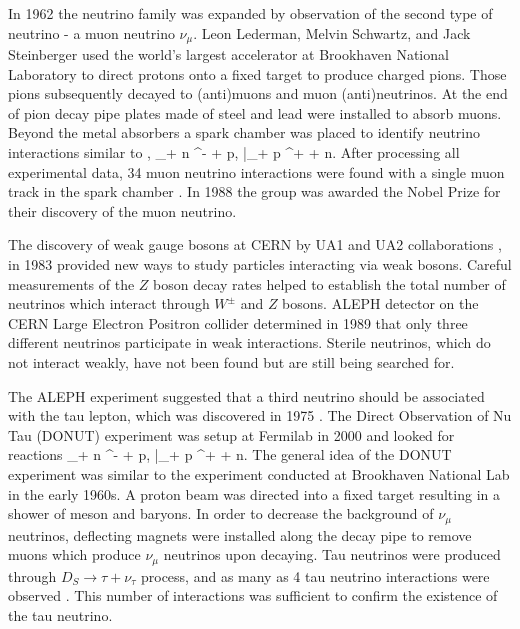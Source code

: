 In 1962 the neutrino family was expanded by observation of the second type of neutrino - 
a muon neutrino $\nu_\mu$.  Leon Lederman, Melvin Schwartz, and Jack Steinberger used 
the world's largest accelerator at Brookhaven National Laboratory to direct protons onto 
a fixed target to produce charged pions. Those pions subsequently decayed to 
(anti)muons and muon (anti)neutrinos. At the end of pion decay pipe plates made of steel 
and lead were installed to absorb muons. Beyond the metal absorbers a spark chamber was 
placed to identify neutrino interactions similar to ,
\be
\nu_\mu + n \rightarrow \mu^- + p,\qquad
\bar{\nu}_\mu + p \rightarrow \mu^+ + n.
\ee
After processing all experimental data, 34 muon neutrino interactions were found with 
a single muon track in the spark chamber \cite{danby}. In 1988 the group was awarded 
the Nobel Prize for their discovery of the muon neutrino.

The discovery of weak gauge bosons at CERN by UA1 and UA2 collaborations \cite{arnison}, 
\cite{arnison2} in 1983 provided new ways to study particles interacting via weak bosons. 
Careful measurements of the $Z$ boson decay rates helped to establish the total number 
of neutrinos which interact through $W^\pm$ and $Z$ bosons. ALEPH detector on the 
CERN Large Electron Positron collider determined \cite{decamp} in 1989 that only 
three different neutrinos participate in weak interactions. Sterile neutrinos, which 
do not interact weakly, have not been found but are still being searched for.

The ALEPH experiment suggested that a third neutrino should be associated with the tau 
lepton, which was discovered in 1975 \cite{perl}. The Direct Observation of Nu Tau (DONUT) 
experiment was setup at Fermilab in 2000 and looked for reactions
\be
\nu_\tau + n \rightarrow \tau^- + p,\qquad
\bar{\nu}_\tau + p \rightarrow \tau^+ + n.
\ee
The general idea of the DONUT experiment was similar to the experiment conducted at 
Brookhaven National Lab in the early 1960s. A proton beam was directed into a fixed 
target resulting in a shower of meson and baryons. In order to decrease the background 
of $\nu_\mu$ neutrinos, deflecting magnets were installed along the decay pipe to remove 
muons which produce $\nu_\mu$ neutrinos upon decaying. Tau neutrinos were produced through 
$D_S \rightarrow \tau + \nu_\tau$ process, and as many as 4 tau neutrino interactions 
were observed \cite{kodama}. This number of interactions was sufficient to confirm 
the existence of the tau neutrino.

